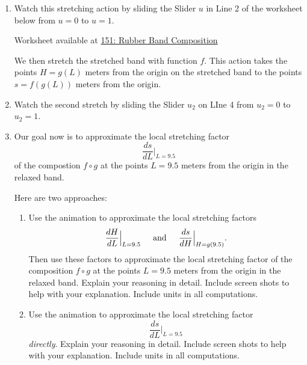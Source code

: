 \documentclass{ximera}
\begin{document}
\begin{enumerate}

\item Watch this stretching action by sliding the Slider $u$ in Line 2 of the worksheet below from $u=0$ to $u=1$.

 

\begin{onlineOnly}
    \begin{center}
\end{center}
\end{onlineOnly}

Worksheet available at \href{https://www.desmos.com/calculator/8whlpa61hn}{151: Rubber Band Composition}



We then stretch the stretched band with function $f$. This action takes the points $H=g(L)$ meters from the origin on the stretched band to the points $s=f(g(L))$ meters from the origin. 

\item Watch the second stretch by sliding the Slider $u_2$ on LIne 4 from $u_2=0$ to $u_2=1$.

\item Our goal now is to approximate the local stretching factor
\[
 \frac{ds}{dL} \Big|_{L=9.5}
\]
of the compostion $f\circ g$ at the points $L=9.5$ meters from the origin in the relaxed band.

Here are two approaches:

\begin{enumerate}
\item Use the animation to approximate the local stretching factors
\[
      \frac{dH}{dL}\Big|_{L=9.5} \hskip 0.2 in  \text{and} \hskip 0.2 in \frac{ds}{dH}\Big|_{H=g(9.5)}.
\]
Then use these factors to approximate the local stretching factor of the composition $f\circ g$ at the points $L=9.5$ meters from the origin in the relaxed band. Explain your reasoning in detail. Include screen shots to help with your explanation. Include units in all computations.
\begin{freeResponse}
\end{freeResponse}

\item Use the animation to approximate the local stretching factor
\[
  \frac{ds}{dL} \Big|_{L=9.5}
\]
\emph{directly}. Explain your reasoning in detail. Include screen shots to help with your explanation. Include units in all computations.
\begin{freeResponse}
\end{freeResponse}

\end{enumerate}

 \end{enumerate}
\end{document}
